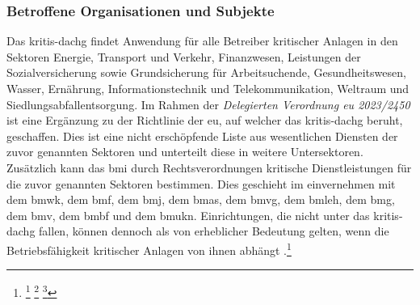 \documentclass[11pt,a4paper,hidelinks]{article}   %
\begin{document}
            \subsubsection{Betroffene Organisationen und Subjekte}
                Das \gls{kritis-dachg} findet Anwendung für alle Betreiber kritischer Anlagen in den Sektoren Energie, Transport und Verkehr, Finanzwesen, Leistungen der Sozialversicherung sowie Grundsicherung für Arbeitsuchende, Gesundheitswesen, Wasser, Ernährung, Informationstechnik und Telekommunikation, Weltraum und Siedlungsabfallentsorgung. Im Rahmen der \emph{Delegierten Verordnung \gls{eu} 2023/2450} ist eine Ergänzung zu der Richtlinie der \gls{eu}, auf welcher das \gls{kritis-dachg} beruht, geschaffen. Dies ist eine nicht erschöpfende Liste aus wesentlichen Diensten der zuvor genannten Sektoren und unterteilt diese in weitere Untersektoren. Zusätzlich kann das \gls{bmi} durch Rechtsverordnungen kritische Dienstleistungen für die zuvor genannten Sektoren bestimmen. Dies geschieht im einvernehmen mit dem \gls{bmwk}, dem \gls{bmf}, dem \gls{bmj}, dem \gls{bmas}, dem \gls{bmvg}, dem \gls{bmleh}, dem \gls{bmg}, dem \gls{bmv}, dem \gls{bmbf} und dem \gls{bmukn}. Einrichtungen, die nicht unter das \gls{kritis-dachg} fallen, können dennoch als von erheblicher Bedeutung gelten, wenn die Betriebsfähigkeit kritischer Anlagen von ihnen abhängt .\footnote{
                    \footcite[Vgl.][, §4, Absatz 1]{KRITIS-DachG}
                    \footcite[Vgl.][, §4, Absatz 3 \& 4]{KRITIS-DachG}
                    \footcite[Vgl.][, Artikel 2, Nummer 1]{EU2023-2450}
                }
\end{document}

